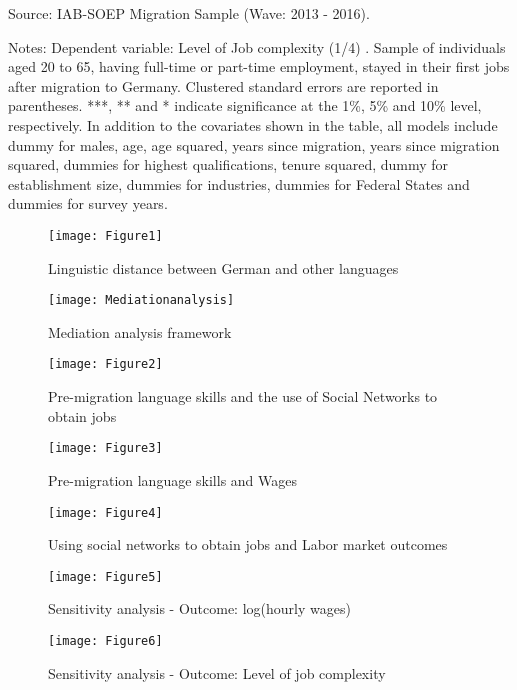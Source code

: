 \documentclass[12pt,a4paper]{article}
\begin{document}
\begin{landscape}
\begin{table}[htbp]
\begin{tablenotes}
      \small
      \item Source: IAB-SOEP Migration Sample (Wave: 2013 - 2016).
      \item Notes: Dependent variable: Level of Job complexity (1/4) . Sample of individuals aged 20 to 65, having full-time or part-time employment, stayed in their first jobs after migration to Germany. Clustered standard errors are reported in parentheses.  ***, ** and * indicate significance at the 1\%, 5\% and 10\% level, respectively. In addition to the covariates shown in the table, all models include dummy for males, age, age squared, years since migration, years since migration squared, dummies for highest qualifications, tenure squared, dummy for establishment size, dummies for industries, dummies for  Federal States and dummies for survey years.
    \end{tablenotes}

\end{table}%

\end{landscape}

\begin{figure}
\centering     %
\texttt{[image: Figure1]}
\caption{Linguistic distance between German and other languages}
\end{figure}

\begin{figure}
\centering     %
\texttt{[image: Mediationanalysis]}
\caption{Mediation analysis framework}
\end{figure}

\begin{figure}
\centering     %
\texttt{[image: Figure2]}
\caption{Pre-migration language skills and the use of Social Networks to obtain jobs}
\end{figure}

\begin{figure}
\centering     %
\texttt{[image: Figure3]}
\caption{Pre-migration language skills and Wages}
\end{figure}

\begin{figure}
\centering     %
\texttt{[image: Figure4]}
\caption{Using social networks to obtain jobs and Labor market outcomes}
\end{figure}

\begin{figure}
\centering     %
\texttt{[image: Figure5]}
\caption{Sensitivity analysis - Outcome: log(hourly wages)}
\end{figure}

\begin{figure}
\centering     %
\texttt{[image: Figure6]}
\caption{Sensitivity analysis - Outcome: Level of job complexity}
\end{figure}
\end{document}
